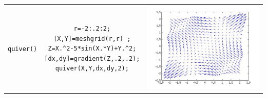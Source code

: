 \documentclass[11pt]{article}
\begin{document}
\begin{center}
\begin{longtable}{||l|c|c||}
\begin{minipage}{0.3\textwidth}
\end{minipage}
\\
\hline
  \texttt{quiver()}		& 
\begin{minipage}{3in}
\begin{verbatim}
r=-2:.2:2;
[X,Y]=meshgrid(r,r) ;
Z=X.^2-5*sin(X.*Y)+Y.^2;
[dx,dy]=gradient(Z,.2,.2);
quiver(X,Y,dx,dy,2);
\end{verbatim}
\end{minipage}
&
\begin{minipage}{0.3\textwidth}
\includegraphics[width=\textwidth]{./ej5.jpg}
\end{minipage}
\\
  \end{longtable}
 \end{center}
\end{document}
